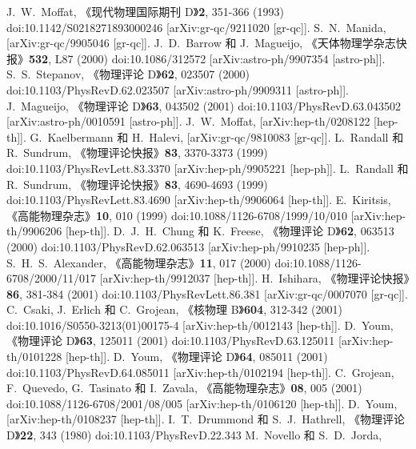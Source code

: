 \documentclass[jkps,preprint,fleqn]{revtex4}
\begin{document}
\begin{CJK*}{UTF8}{gbsn}
\begin{thebibliography}{999}
J.~W.~Moffat,
《现代物理国际期刊 D》\textbf{2}, 351-366 (1993)
doi:10.1142/S0218271893000246
[arXiv:gr-qc/9211020 [gr-qc]].
S.~N.~Manida,
[arXiv:gr-qc/9905046 [gr-qc]].
J.~D.~Barrow 和 J.~Magueijo,
《天体物理学杂志快报》\textbf{532}, L87 (2000)
doi:10.1086/312572
[arXiv:astro-ph/9907354 [astro-ph]].
S.~S.~Stepanov,
《物理评论 D》\textbf{62}, 023507 (2000)
doi:10.1103/PhysRevD.62.023507
[arXiv:astro-ph/9909311 [astro-ph]].
J.~Magueijo,
《物理评论 D》\textbf{63}, 043502 (2001)
doi:10.1103/PhysRevD.63.043502
[arXiv:astro-ph/0010591 [astro-ph]].
J.~W.~Moffat,
[arXiv:hep-th/0208122 [hep-th]].
G.~Kaelbermann 和 H.~Halevi,
[arXiv:gr-qc/9810083 [gr-qc]].
L.~Randall 和 R.~Sundrum,
《物理评论快报》\textbf{83}, 3370-3373 (1999)
doi:10.1103/PhysRevLett.83.3370
[arXiv:hep-ph/9905221 [hep-ph]].
L.~Randall 和 R.~Sundrum,
《物理评论快报》\textbf{83}, 4690-4693 (1999)
doi:10.1103/PhysRevLett.83.4690
[arXiv:hep-th/9906064 [hep-th]].
E.~Kiritsis,
《高能物理杂志》\textbf{10}, 010 (1999)
doi:10.1088/1126-6708/1999/10/010
[arXiv:hep-th/9906206 [hep-th]].
D.~J.~H.~Chung 和 K.~Freese,
《物理评论 D》\textbf{62}, 063513 (2000)
doi:10.1103/PhysRevD.62.063513
[arXiv:hep-ph/9910235 [hep-ph]].
S.~H.~S.~Alexander,
《高能物理杂志》\textbf{11}, 017 (2000)
doi:10.1088/1126-6708/2000/11/017
[arXiv:hep-th/9912037 [hep-th]].
H.~Ishihara,
《物理评论快报》\textbf{86}, 381-384 (2001)
doi:10.1103/PhysRevLett.86.381
[arXiv:gr-qc/0007070 [gr-qc]].
C.~Csaki, J.~Erlich 和 C.~Grojean,
《核物理 B》\textbf{604}, 312-342 (2001)
doi:10.1016/S0550-3213(01)00175-4
[arXiv:hep-th/0012143 [hep-th]].
D.~Youm,
《物理评论 D》\textbf{63}, 125011 (2001)
doi:10.1103/PhysRevD.63.125011
[arXiv:hep-th/0101228 [hep-th]].
D.~Youm,
《物理评论 D》\textbf{64}, 085011 (2001)
doi:10.1103/PhysRevD.64.085011
[arXiv:hep-th/0102194 [hep-th]].
C.~Grojean, F.~Quevedo, G.~Tasinato 和 I.~Zavala,
《高能物理杂志》\textbf{08}, 005 (2001)
doi:10.1088/1126-6708/2001/08/005
[arXiv:hep-th/0106120 [hep-th]].
D.~Youm,
[arXiv:hep-th/0108237 [hep-th]].
I.~T.~Drummond 和 S.~J.~Hathrell,
《物理评论 D》\textbf{22}, 343 (1980)
doi:10.1103/PhysRevD.22.343
M.~Novello 和 S.~D.~Jorda,

\end{thebibliography}
\end{CJK*}
\end{document}
